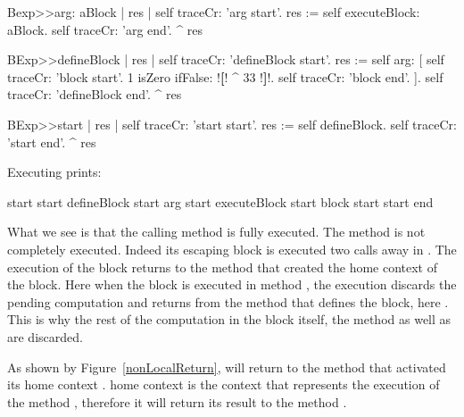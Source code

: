 \documentclass[a4paper,10pt,twoside]{book}
\begin{document}
\begin{code}{}
Bexp>>arg: aBlock
	| res |
	self traceCr: 'arg start'. 
	res := self executeBlock: aBlock.
	self traceCr: 'arg end'. 
	^ res 
\end{code}

\begin{code}{}
BExp>>defineBlock
	| res |
	self traceCr: 'defineBlock start'.
	res := self arg: [ self traceCr: 'block start'. 
                            1 isZero ifFalse: !\textbf{[}! ^ 33 !\textbf{]}!.
                            self traceCr: 'block end'. ].
	self traceCr: 'defineBlock end'.
	^ res
\end{code}


\begin{code}{}
BExp>>start
	| res |
	self traceCr: 'start start'.
	res := self defineBlock.
	self traceCr: 'start end'.
	^ res
\end{code}

Executing   prints:

\begin{code}{}
start start
defineBlock start
arg start
executeBlock start
block start
start end
\end{code}

What we see is that the calling method  is fully executed. The method  is not completely executed. Indeed its escaping block \ct{[^33]} is executed two calls away in . The execution of the block returns to the method that created the home context of the block. Here when the block is executed in method , the execution discards the pending computation and returns from the method that defines the block, here . This is why the rest of the computation in the block itself, the  method as well as  are discarded. 

As shown by Figure~\ref{nonLocalReturn}, \ct{[^3]} will return to the method that activated its home context . \ct{[^33]} home context is the context that represents the execution of the method , therefore it will return its result to the method .
\end{document}
